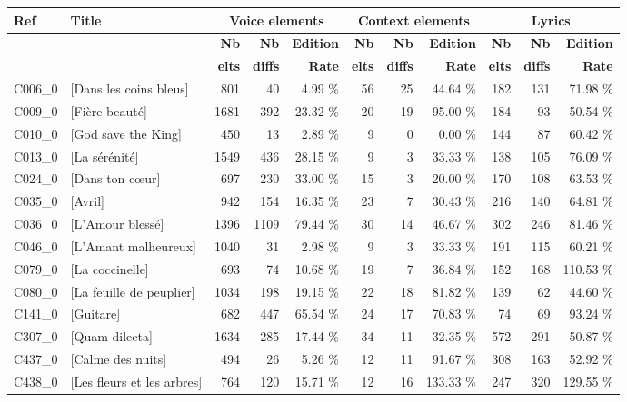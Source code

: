 \begin{small}
\begin{tabular}{l|l|r|r|r|r|r|r|r|r|r}
\textbf{Ref}& \textbf{Title} & \multicolumn{3}{c|}{\textbf{Voice elements}}  & \multicolumn{3}{c|}{\textbf{Context elements}} & \multicolumn{3}{c}{\textbf{Lyrics}}\\ 
\hline
 &  & \textbf{Nb} &  \textbf{Nb}  & \textbf{Edition} & \textbf{Nb} &  \textbf{Nb}  & \textbf{Edition}& \textbf{Nb} &  \textbf{Nb}  & \textbf{Edition} \\ 
 &  & \textbf{elts} &  \textbf{diffs} & \textbf{Rate} & \textbf{elts} &  \textbf{diffs} & \textbf{Rate} & \textbf{elts} &  \textbf{diffs} & \textbf{Rate} \\ \hline
C006\_0 & [Dans les coins bleus] & 801 & 40 & 4.99 \%& 56 & 25 & 44.64 \%& 182 & 131 & 71.98 \% \\ 
 C009\_0 & [Fière beauté] & 1681 & 392 & 23.32 \%& 20 & 19 & 95.00 \%& 184 & 93 & 50.54 \% \\ 
 C010\_0 & [God save the King]& 450 & 13 & 2.89 \%& 9 & 0 & 0.00 \%& 144 & 87 & 60.42 \% \\ 
 C013\_0 & [La sérénité] & 1549 & 436 & 28.15 \%& 9 & 3 & 33.33 \%& 138 & 105 & 76.09 \% \\ 
 C024\_0 & [Dans ton cœur]& 697 & 230 & 33.00 \%& 15 & 3 & 20.00 \%& 170 & 108 & 63.53 \% \\ 
 C035\_0 & [Avril]& 942 & 154 & 16.35 \%& 23 & 7 & 30.43 \%& 216 & 140 & 64.81 \% \\ 
 C036\_0 & [L'Amour blessé]& 1396 & 1109 & 79.44 \%& 30 & 14 & 46.67 \%& 302 & 246 & 81.46 \% \\ 
 C046\_0 & [L'Amant malheureux]& 1040 & 31 & 2.98 \%& 9 & 3 & 33.33 \%& 191 & 115 & 60.21 \% \\ 
 C079\_0 & [La coccinelle] & 693 & 74 & 10.68 \%& 19 & 7 & 36.84 \%& 152 & 168 & 110.53 \% \\ 
 C080\_0 & [La feuille de peuplier]& 1034 & 198 & 19.15 \%& 22 & 18 & 81.82 \%& 139 & 62 & 44.60 \% \\ 
 C141\_0 & [Guitare] & 682 & 447 & 65.54 \%& 24 & 17 & 70.83 \%& 74 & 69 & 93.24 \% \\ 
 C307\_0 & [Quam dilecta]& 1634 & 285 & 17.44 \%& 34 & 11 & 32.35 \%& 572 & 291 & 50.87 \% \\ 
 C437\_0 & [Calme des nuits]& 494 & 26 & 5.26 \%& 12 & 11 & 91.67 \%& 308 & 163 & 52.92 \% \\ 
 C438\_0 & [Les fleurs et les arbres]& 764 & 120 & 15.71 \%& 12 & 16 & 133.33 \%& 247 & 320 & 129.55 \% \\ 

\end{tabular}
\end{small}
